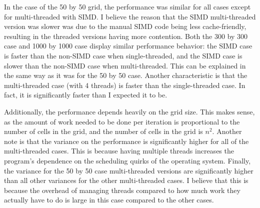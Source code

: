 In the case of the 50 by 50 grid, the performance was similar for all cases
except for multi-threaded with SIMD. I believe the reason that the SIMD multi-threaded version was slower was
due to the manual SIMD code being less cache-friendly, resulting in the threaded versions having more contention.
Both the 300 by 300 case and 1000 by 1000 case display similar performance behavior: the SIMD case is faster than
the non-SIMD case when single-threaded, and the SIMD case is slower than the non-SIMD case when multi-threaded.
This can be explained in the same way as it was for the 50 by 50 case. Another characteristic is that the multi-threaded
case (with 4 threads) is faster than the single-threaded case. In fact, it is significantly faster than I expected it to be.

Additionally, the performance depends heavily on the grid size. This makes sense, as the amount of work needed to be
done per iteration is proportional to the number of cells in the grid, and the number of cells in the grid is $n^2$.
Another note is that the variance on the performance is significantly higher for all of the multi-threaded cases.
This is because having multiple threads increases the program's dependence on the scheduling quirks of the operating
system. Finally, the variance for the 50 by 50 case multi-threaded versions are significantly higher than all other
variances for the other multi-threaded cases. I believe that this is because the overhead of managing threads compared
to how much work they actually have to do is large in this case compared to the other cases.

\vspace{5mm}

